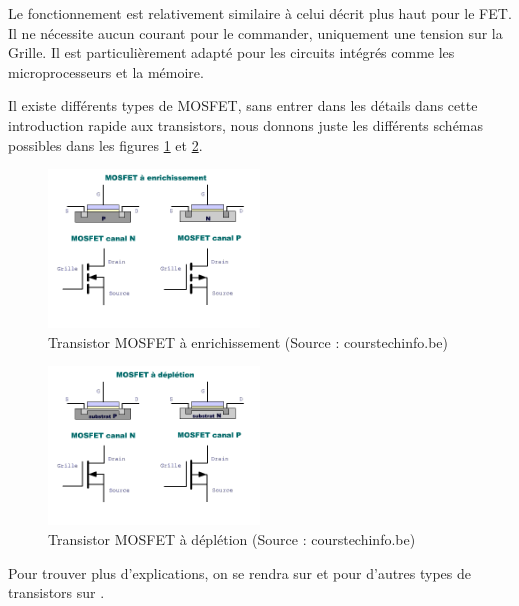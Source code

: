 \documentclass[a4paper,11pt]{book}
\theoremstyle{definition}
\begin{document}
Le fonctionnement est relativement similaire à celui décrit plus haut pour le FET. Il ne nécessite aucun courant pour le commander, uniquement une tension sur la Grille. Il est particulièrement adapté pour les circuits intégrés comme les microprocesseurs et la mémoire.

Il existe différents types de MOSFET, sans entrer dans les détails dans cette introduction rapide aux transistors, nous donnons juste les différents schémas possibles dans les figures \ref{fig:EMOS} et \ref{fig:DMOS}. 

\begin{figure}
\centering
\includegraphics[width=0.5\textwidth]{media/Semicon/EMOS.png}
\caption{Transistor MOSFET à enrichissement (Source : courstechinfo.be)}
\label{fig:EMOS}
\end{figure}

\begin{figure}
\centering
\includegraphics[width=0.5\textwidth]{media/Semicon/DMOS.png}
\caption{Transistor MOSFET à déplétion (Source : courstechinfo.be)}
\label{fig:DMOS}
\end{figure}

Pour trouver plus d'explications, on se rendra sur \cite{semiconducteurs} et pour d'autres types de transistors sur \cite{effetdechamp}.


%
\end{document}
